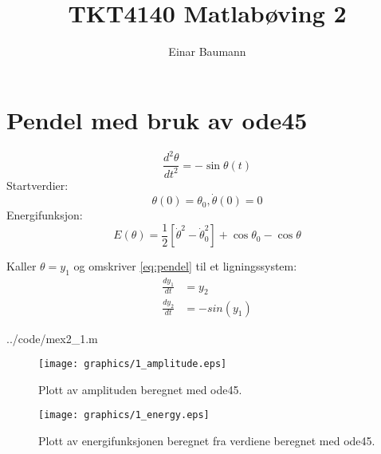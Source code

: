 



\author{Einar Baumann}
\title{TKT4140 Matlabøving 2}
\maketitle

\section{Pendel med bruk av ode45} %
\label{sec:pendel_med_bruk_av_ode45}

\begin{equation}
   \frac{d^2\theta}{dt^2} = - \sin \theta(t) \label{eq:pendel}
\end{equation}
Startverdier:
\begin{equation}
  \nonumber
  \theta(0) = \theta_0, \dot \theta (0) = 0
\end{equation}
Energifunksjon:
\begin{equation}
  E(\theta) = \frac{1}{2} \left[ \dot \theta ^2 - \dot \theta_0^2 \right]
              + \cos \theta_0 - \cos \theta
\end{equation}

\noindent Kaller $\theta = y_1$ og omskriver \eqref{eq:pendel} til et ligningssystem:
\begin{align}
  \frac{dy_1}{dt} &= y_2 \\
  \frac{dy_2}{dt} &= -sin(y_1)
\end{align}


  {../code/mex2_1.m}

\begin{figure}[H]
  \centering
  \texttt{[image: graphics/1\_amplitude.eps]}
  \caption{Plott av amplituden beregnet med ode45.}
  \label{fig:amplitude}
\end{figure}

\begin{figure}[H]
  \centering
  \texttt{[image: graphics/1\_energy.eps]}
  \caption{Plott av energifunksjonen beregnet fra verdiene beregnet med ode45.}
  \label{fig:energi}
\end{figure}



\clearpage
